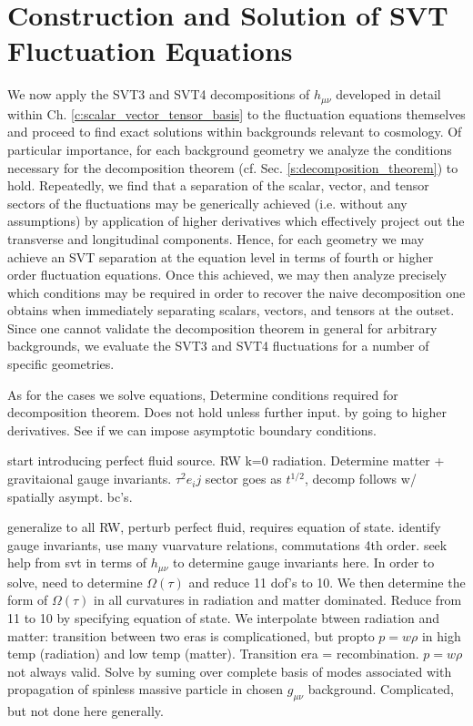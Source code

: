 
\chapter{Construction and Solution of SVT Fluctuation Equations}
\label{c:construction_and_solution_of_svt}

We now apply the SVT3 and SVT4 decompositions of $h_{\mu\nu}$ developed in detail within Ch. \ref{c:scalar_vector_tensor_basis} to the fluctuation equations themselves and proceed to find exact solutions within backgrounds relevant to cosmology. Of particular importance, for each background geometry we analyze the conditions necessary for the decomposition theorem (cf. Sec. \ref{s:decomposition_theorem}) to hold. Repeatedly, we find that a separation of the scalar, vector, and tensor sectors of the fluctuations may be generically achieved (i.e. without any assumptions) by application of higher derivatives which effectively project out the transverse and longitudinal components. Hence, for each geometry we may achieve an SVT separation at the equation level in terms of fourth or higher order fluctuation equations. Once this achieved, we may then analyze precisely which conditions may be required in order to recover the naive decomposition one obtains when immediately separating scalars, vectors, and tensors at the outset. Since one cannot validate the decomposition theorem in general for arbitrary backgrounds, we evaluate the SVT3 and SVT4 fluctuations for a number of specific geometries. 

As for the cases we 
solve equations, Determine conditions required for decomposition theorem. Does not hold unless further input. by going to higher derivatives. See if we can impose asymptotic boundary conditions. 

start introducing perfect fluid source. RW k=0 radiation. Determine matter + gravitaional gauge invariants. $\tau^2 e_ij$ sector goes as $t^{1/2}$, decomp follows w/ spatially asympt. bc's.

generalize to all RW, perturb perfect fluid, requires equation of state. identify gauge invariants, use many vuarvature relations, commutations 4th order. seek help from svt in terms of $h_{\mu\nu}$ to determine gauge invariants here. In order to solve, need to determine $\Omega(\tau)$ and reduce 11 dof's to 10. We then determine the form of $\Omega(\tau)$ in all curvatures in radiation and matter dominated. Reduce from 11 to 10 by specifying equation of state. We interpolate btween radiation and matter: transition between two eras is complicationed, but propto $p=w\rho$ in high temp (radiation) and low temp (matter). Transition era = recombination. $p=w\rho$ not always valid. Solve by suming over complete basis of modes associated with propagation of spinless massive particle in chosen $g_{\mu\nu}$ background. Complicated, but not done here generally. 

